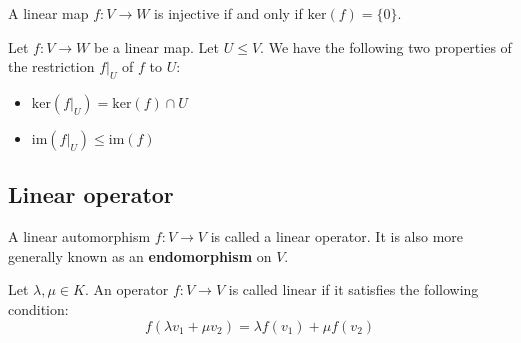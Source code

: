 
    
	\begin{theorem}
    	A linear map $f:V\rightarrow W$ is injective if and only if $\text{ker}(f) = \{0\}$.
	\end{theorem}
    \begin{property}
		\label{linalgebra:theorem:restriction_kernel_image}
        Let $f:V\rightarrow W$ be a linear map. Let $U\leq V$. We have the following two properties of the restriction $f|_U$ of $f$ to $U$:
        \begin{itemize}
			\item $\text{ker}\left(f|_U\right) = \text{ker}(f)\cap U$
            \item $\text{im}\left(f|_U\right) \leq \text{im}(f)$
		\end{itemize}
	\end{property}
    
	\subsection{Linear operator}
    	\begin{definition}
    	A linear automorphism $f: V \rightarrow V$ is called a linear operator. It is also more generally known as an \textbf{endomorphism} on $V$.
    \end{definition}
    	\begin{property}
			Let $\lambda, \mu \in K$. An operator $f: V \rightarrow V$ is called linear if it satisfies the following condition:
            \begin{equation}
				\label{linalgebra:operators:linearity}
                f(\lambda v_1 + \mu v_2) = \lambda f(v_1) + \mu f(v_2)
			\end{equation}
		\end{property}
        
